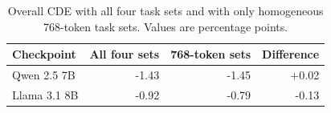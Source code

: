 \begin{table}[t]
\centering\scriptsize
\caption{Overall CDE with all four task sets and with only homogeneous 768-token task sets. Values are percentage points.}
\label{tab:budget}
\begin{tabular}{@{}lrrr@{}}
\toprule
Checkpoint & All four sets & 768-token sets & Difference \\
\midrule
Qwen 2.5 7B & -1.43 & -1.45 & +0.02 \\
Llama 3.1 8B & -0.92 & -0.79 & -0.13 \\
\bottomrule
\end{tabular}
\end{table}
